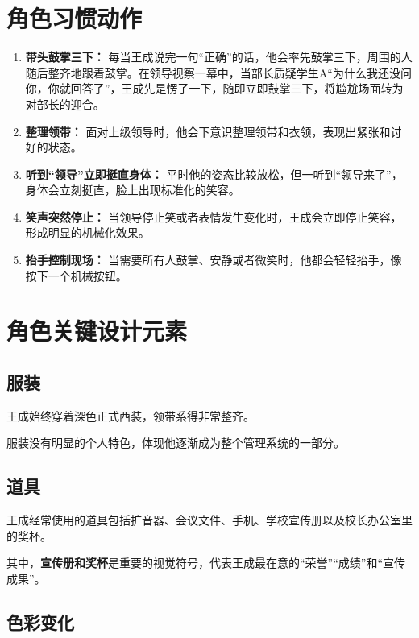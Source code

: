 \documentclass[12pt,a4paper]{ctexart}
\begin{document}
	\section{角色习惯动作}
	
	\begin{enumerate}[leftmargin=2.5em]
		\item \textbf{带头鼓掌三下：}
		每当王成说完一句“正确”的话，他会率先鼓掌三下，周围的人随后整齐地跟着鼓掌。在领导视察一幕中，当部长质疑学生A“为什么我还没问你，你就回答了”，王成先是愣了一下，随即立即鼓掌三下，将尴尬场面转为对部长的迎合。
		\item \textbf{整理领带：}
		面对上级领导时，他会下意识整理领带和衣领，表现出紧张和讨好的状态。
		\item \textbf{听到“领导”立即挺直身体：}
		平时他的姿态比较放松，但一听到“领导来了”，身体会立刻挺直，脸上出现标准化的笑容。
		\item \textbf{笑声突然停止：}
		当领导停止笑或者表情发生变化时，王成会立即停止笑容，形成明显的机械化效果。
		\item \textbf{抬手控制现场：}
		当需要所有人鼓掌、安静或者微笑时，他都会轻轻抬手，像按下一个机械按钮。
	\end{enumerate}
	
	\section{角色关键设计元素}
	
	\subsection{服装}
	
	王成始终穿着深色正式西装，领带系得非常整齐。
	
	服装没有明显的个人特色，体现他逐渐成为整个管理系统的一部分。
	
	\subsection{道具}
	
	王成经常使用的道具包括扩音器、会议文件、手机、学校宣传册以及校长办公室里的奖杯。
	
	其中，\textbf{宣传册和奖杯}是重要的视觉符号，代表王成最在意的“荣誉”“成绩”和“宣传成果”。
	
	\subsection{色彩变化}
	
\end{document}
